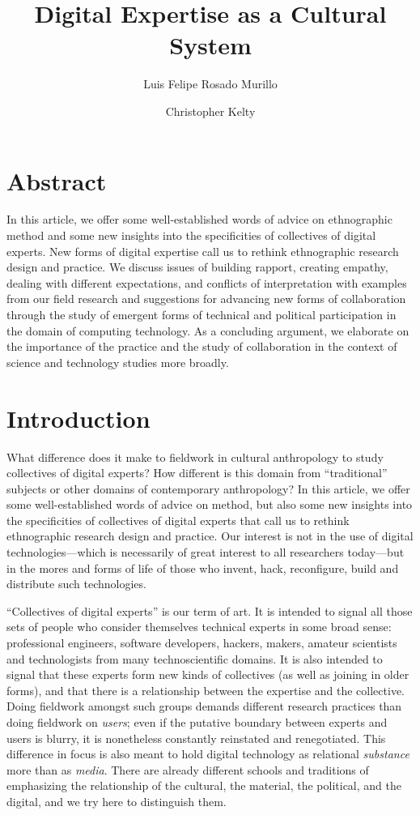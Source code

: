 \documentclass[10pt,letter,oneside]{scrartcl}
\author[1]{Luis Felipe Rosado Murillo}
\author[2]{Christopher Kelty}
\affil[1]{Berkman Center for Internet and Society, Harvard}
\affil[2]{Institute for Society and Genetics, Department of Anthropology, and Department of Information Studies, UCLA}
\title{Digital Expertise as a Cultural System}
\date{}
\begin{document}
\maketitle
\section{Abstract}
In this article, we offer some well-established words of advice on
ethnographic method and some new insights into the specificities of
collectives of digital experts. New forms of digital expertise call us
to rethink ethnographic research design and practice. We discuss
issues of building rapport, creating empathy, dealing with different
expectations, and conflicts of interpretation with examples from our
field research and suggestions for advancing new forms of
collaboration through the study of emergent forms of technical and
political participation in the domain of computing technology.  As a
concluding argument, we elaborate on the importance of the practice
and the study of collaboration in the context of science and
technology studies more broadly.

\doublespacing
\section{Introduction}

What difference does it make to fieldwork in cultural anthropology to
study collectives of digital experts?  How different is this domain
from ``traditional'' subjects or other domains of contemporary
anthropology?  In this article, we offer some well-established words
of advice on method, but also some new insights into the specificities
of collectives of digital experts that call us to rethink ethnographic
research design and practice.  Our interest is not in the use of
digital technologies---which is necessarily of great interest to all
researchers today---but in the mores and forms of life of those who
invent, hack, reconfigure, build and distribute such technologies. 

``Collectives of digital experts'' is our term of art.  It is intended
to signal all those sets of people who consider themselves technical
experts in some broad sense: professional engineers, software
developers, hackers, makers, amateur scientists and technologists from
many technoscientific domains.  It is also intended to signal that
these experts form new kinds of collectives (as well as joining in
older forms), and that there is a relationship between the expertise
and the collective.  Doing fieldwork amongst such groups demands
different research practices than doing fieldwork on \emph{users};
even if the putative boundary between experts and users is blurry, it
is nonetheless constantly reinstated and renegotiated.  This
difference in focus is also meant to hold digital technology as
relational \emph{substance} more than as \emph{media}.  There are
already different schools and traditions of emphasizing the
relationship of the cultural, the material, the political, and the
digital, and we try here to distinguish them.
\end{document}
